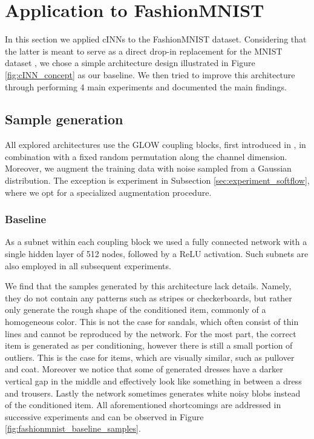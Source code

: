 \documentclass[final]{cvpr}
\begin{document}
\section{Application to FashionMNIST}
In this section we applied cINNs to the FashionMNIST dataset. Considering that the latter is meant to serve as a direct drop-in replacement for the MNIST dataset \cite{fashion_mnist}, we chose a simple architecture design illustrated in Figure \ref{fig:cINN_concept} as our baseline. We then tried to improve this architecture through performing 4 main experiments and documented the main findings. 

\subsection{Sample generation}
All explored architectures use the GLOW coupling blocks, first introduced in \cite{GLOW}, in combination with a fixed random permutation along the channel dimension. Moreover, we augment the training data with noise sampled from a Gaussian distribution.  The exception is experiment in Subsection \ref{sec:experiment_softflow}, where we opt for a specialized augmentation procedure.

\subsubsection{Baseline}\label{sec:experiment_baseline}
As a subnet within each coupling block we used a fully connected network with a single hidden layer of 512 nodes, followed by a ReLU activation. Such subnets are also employed in all subsequent experiments.

We find that the samples generated by this architecture lack details. Namely, they do not contain any patterns such as stripes or checkerboards, but rather only generate the rough shape of the conditioned item, commonly of a homogeneous color. This is not the case for sandals, which often consist of thin lines and cannot be reproduced by the network. For the most part, the correct item is generated as per conditioning, however there is still a small portion of outliers. This is the case for items, which are visually similar, such as pullover and coat. Moreover we notice that some of generated dresses have a darker vertical gap in the middle and effectively look like something in between a dress and trousers. Lastly the network sometimes generates white noisy blobs instead of the conditioned item. All aforementioned shortcomings are addressed in successive experiments and can be observed in Figure \ref{fig:fashionmnist_baseline_samples}.
\end{document}
